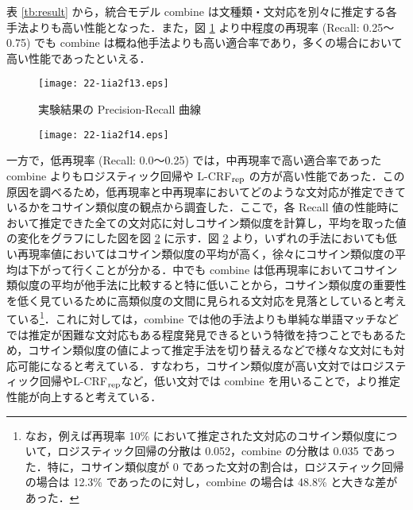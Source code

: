 \documentclass[japanese]{jnlp_1.4}
\begin{document}
表 \ref{tb:result} から，統合モデル combine は文種類・文対応を別々に推定する各手法よりも高い性能となった．また，図 \ref{fig:pr} より中程度の再現率 (Recall: 0.25〜0.75) でも combine は概ね他手法よりも高い適合率であり，多くの場合において高い性能であったといえる．

\begin{figure}[b]
\begin{center}
\texttt{[image: 22-1ia2f13.eps]}
\end{center}
\caption{実験結果の Precision-Recall 曲線}
\label{fig:pr}
\end{figure}
\begin{figure}[b]
\begin{center}
\texttt{[image: 22-1ia2f14.eps]}
\end{center}
\label{fig:recall-vs-avgcossim}
\vspace{-0.5\Cvs}
\end{figure}


一方で，低再現率 (Recall: 0.0〜0.25) では，中再現率で高い適合率であった combine よりもロジスティック回帰や L-CRF$_{\rm rep}$ の方が高い性能であった．この原因を調べるため，低再現率と中再現率においてどのような文対応が推定できているかをコサイン類似度の観点から調査した．ここで，各 Recall 値の性能時において推定できた全ての文対応に対しコサイン類似度を計算し，平均を取った値の変化をグラフにした図を図 \ref{fig:recall-vs-avgcossim} に示す．図 \ref{fig:recall-vs-avgcossim} より，いずれの手法においても低い再現率値においてはコサイン類似度の平均が高く，徐々にコサイン類似度の平均は下がって行くことが分かる．中でも combine は低再現率においてコサイン類似度の平均が他手法に比較すると特に低いことから，コサイン類似度の重要性を低く見ているために高類似度の文間に見られる文対応を見落としていると考えている\footnote{なお，例えば再現率 10\% において推定された文対応のコサイン類似度について，ロジスティック回帰の分散は 0.052，combine の分散は 0.035 であった．特に，コサイン類似度が 0 であった文対の割合は，ロジスティック回帰の場合は 12.3\% であったのに対し，combine の場合は 48.8\% と大きな差があった．}．これに対しては，combine では他の手法よりも単純な単語マッチなどでは推定が困難な文対応もある程度発見できるという特徴を持つことでもあるため，コサイン類似度の値によって推定手法を切り替えるなどで様々な文対にも対応可能になると考えている．すなわち，コサイン類似度が高い文対ではロジスティック回帰やL-CRF$_{\rm rep}$など，低い文対では combine を用いることで，より推定性能が向上すると考えている．
\end{document}
